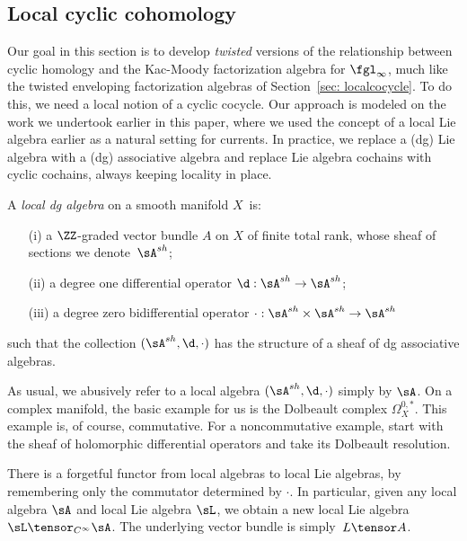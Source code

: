 \subsection{Local cyclic cohomology}

Our goal in this section is to develop {\em twisted} versions of the relationship between cyclic homology and the Kac-Moody factorization algebra for $\fgl_\infty$,
much like the twisted enveloping factorization algebras of Section~\ref{sec: localcocycle}. 
To do this, we need a local notion of a cyclic cocycle. 
Our approach is modeled on the work we undertook earlier in this paper,
where we used the concept of a local Lie algebra earlier as a natural setting for currents. 
In practice, we replace a (dg) Lie algebra with a (dg) associative algebra and replace Lie algebra cochains with cyclic cochains, 
always keeping locality in place.


\begin{dfn}\label{def: localalg}
A {\em local dg algebra} on a smooth manifold $X$~is:
\begin{enumerate}
\item[(i)] a $\ZZ$-graded vector bundle $A$ on $X$ of finite total rank, whose sheaf of sections we denote~$\sA^{sh}$;
\item[(ii)] a degree one differential operator $\d : \sA^{sh} \to \sA^{sh}$;
\item[(iii)] a degree zero bidifferential operator $\cdot : \sA^{sh} \times \sA^{sh} \to \sA^{sh}$
\end{enumerate}
such that the collection $(\sA^{sh}, \d, \cdot)$ has the structure of a sheaf of dg associative algebras.
\end{dfn}

As usual, we abusively refer to a local algebra $(\sA^{sh}, \d, \cdot)$ simply by $\sA$.
On a complex manifold, the basic example for us is the Dolbeault complex $\Omega^{0,*}_X$.
This example is, of course, commutative. 
For a noncommutative example, start with the sheaf of holomorphic differential operators and take its Dolbeault resolution. 

There is a forgetful functor from local algebras to local Lie algebras, by remembering only the commutator determined by $\cdot$. 
In particular, given any local algebra $\sA$ and local Lie algebra $\sL$, 
we obtain a new local Lie algebra $\sL \tensor_{C^\infty} \sA$.
The underlying vector bundle is simply~$L \tensor A$. 


